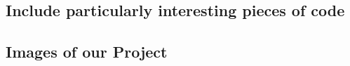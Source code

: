 \documentclass[letterpaper,10pt,serif,draftclsnofoot,onecolumn,compsoc,titlepage]{IEEEtran}
\begin{document}
\subsection{Include particularly interesting pieces of code}
\subsection{Images of our Project} 


\newpage


\end{document}
